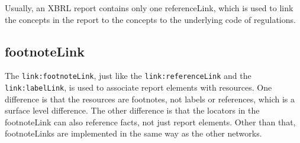 Usually, an XBRL report contains only one referenceLink, 
which is used to link the concepts in the report to the concepts to the underlying code of regulations.

\subsection{footnoteLink}

The \texttt{link:footnoteLink}, just like the \texttt{link:referenceLink} and the \texttt{link:labelLink}, is used to associate report elements with resources.
One difference is that the resources are footnotes, not labels or references, which is a surface level difference.
The other difference is that the locators in the footnoteLink can also reference facts, not just report elements.
Other than that, footnoteLinks are implemented in the same way as the other networks.